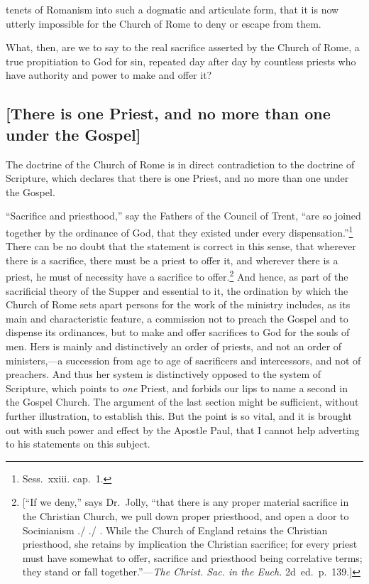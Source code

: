 \documentclass[
  english,
]{book}
\begin{document}
tenets of Romanism into such a dogmatic and articulate form, that it is now utterly impossible for the Church of Rome to deny or escape from them.

What, then, are we to say to the real sacrifice asserted by the Church of Rome, a true propitiation to God for sin, repeated day after day by countless priests who have authority and power to make and offer it?

\hypertarget{there-is-one-priest-and-no-more-than-one-under-the-gospel}{%
\subsection{{[}There is one Priest, and no more than one under the Gospel{]}}\label{there-is-one-priest-and-no-more-than-one-under-the-gospel}}

The doctrine of the Church of Rome is in direct contradiction to the doctrine of Scripture, which declares that there is one Priest, and no more than one under the Gospel.

``Sacrifice and priesthood,'' say the Fathers of the Council of Trent, ``are so joined together by the ordinance of God, that they existed under every dispensation.''\footnote{Sess.~xxiii. cap.~1.} There can be no doubt that the statement is correct in this sense, that wherever there is a sacrifice, there must be a priest to offer it, and wherever there is a priest, he must of necessity have a sacrifice to offer.\footnote{{[}``If we deny,'' says Dr.~Jolly, ``that there is any proper material sacrifice in the Christian Church, we pull down proper priesthood, and open a door to Socinianism ./ ./ . While the Church of England retains the Christian priesthood, she retains by implication the Christian sacrifice; for every priest must have somewhat to offer, sacrifice and priesthood being correlative terms; they stand or fall together.''---\emph{The Christ. Sac. in the Euch.} 2d~ed.~p.~139.{]}} And hence, as part of the sacrificial theory of the Supper and essential to it, the ordination by which the Church of Rome sets apart persons for the work of the ministry includes, as its main and characteristic feature, a commission not to preach the Gospel and to dispense its ordinances, but to make and offer sacrifices to God for the souls of men. Hers is mainly and distinctively an order of priests, and not an order of ministers,---a succession from age to age of sacrificers and intercessors, and not of preachers. And thus her system is distinctively opposed to the system of Scripture, which points to \emph{one} Priest, and forbids our lips to name a second in the Gospel Church. The argument of the last section might be sufficient, without further illustration, to establish this. But the point is so vital, and it is brought out with such power and effect by the Apostle Paul, that I cannot help adverting to his statements on this subject.
\end{document}
